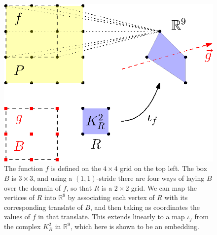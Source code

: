 \documentclass[12pt]{amsart}
\numberwithin{figure}{section}
\begin{document}
\begin{figure}
	\includegraphics{embedding}
	\caption{The function $f$ is defined on the $4 \times 4$ grid on the top left. The box $B$ is $3 \times 3$, and using a $(1,1)$-stride there are four ways of laying $B$ over the domain of $f$, so that $R$ is a $2 \times 2$ grid. We can map the vertices of $R$ into $\mathbb{R}^9$ by associating each vertex of $R$ with its corresponding translate of $B$, and then taking as coordinates the values of $f$ in that translate. This extends linearly to a map $\iota_{f}$ from the complex $K_{R}^2$ in $\mathbb{R}^9$, which here is shown to be an embedding.}
	\label{fig:embedding}
\end{figure}
\end{document}
